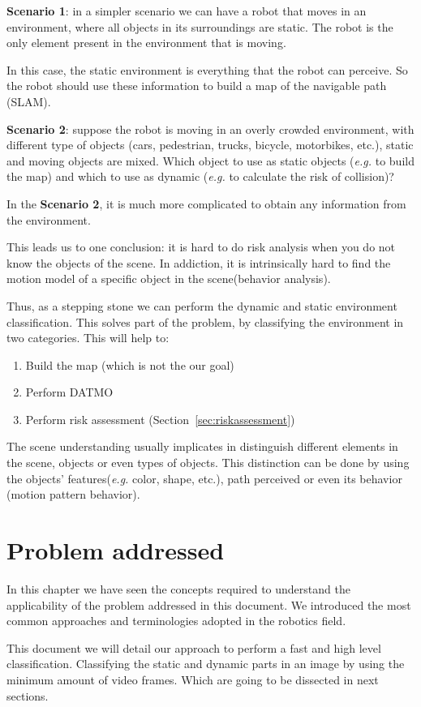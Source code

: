\textbf{Scenario 1}: in a simpler scenario we can have a robot that moves in an environment, where all objects in its surroundings are static. The robot is the only element present in the environment that is moving.

In this case, the static environment is everything that the robot can perceive. So the robot should use these information to build a map of the navigable path (SLAM).

\textbf{Scenario 2}: suppose the robot is moving in an overly crowded environment, with different type of objects (cars, pedestrian, trucks, bicycle, motorbikes, etc.), static and moving objects are mixed. Which object to use as static objects (\textit{e.g.} to build the map) and which to use as dynamic (\textit{e.g.} to calculate the risk of collision)? 

In the \textbf{Scenario 2}, it is much more complicated to obtain any information from the environment.

This leads us to one conclusion: it is hard to do risk analysis when you do not know the objects of the scene. In addiction, it is intrinsically hard to find the motion model of a specific object in the scene(behavior analysis).

Thus, as a stepping stone we can perform the dynamic and static environment classification. This solves part of the problem, by classifying the environment in two categories. This will help to:

\begin{enumerate}
\item Build the map (which is not the our goal)
\item Perform DATMO
\item Perform risk assessment (Section~\ref{sec:riskassessment})
\end{enumerate}

The scene understanding usually implicates in distinguish different elements in the scene, objects or even types of objects. This distinction can be done by using the objects' features(\textit{e.g.} color, shape, etc.), path perceived or even its behavior (motion pattern behavior). 

\section{Problem addressed}

In this chapter we have seen the concepts required to understand the applicability of the problem addressed in this document. We introduced the most common approaches and terminologies adopted in the robotics field. 

This document we will detail our approach to perform a fast and high level classification. Classifying the static and dynamic parts in an image by using the minimum amount of video frames. Which are going to be dissected in next sections.

